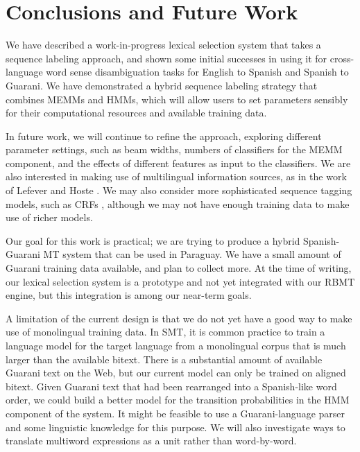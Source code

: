 \section{Conclusions and Future Work}
We have described a work-in-progress lexical selection system that takes a
sequence labeling approach, and shown some initial successes in using it for
cross-language word sense disambiguation tasks for English to Spanish and
Spanish to Guarani.  We have demonstrated a hybrid sequence labeling strategy
that combines MEMMs and HMMs, which will allow users to set parameters sensibly
for their computational resources and available training data.

In future work, we will continue to refine the approach, exploring different
parameter settings, such as beam widths, numbers of classifiers for the MEMM
component, and the effects of different features as input to the classifiers.
We are also interested in making use of multilingual information sources,
as in the work of Lefever and Hoste
\cite{lefever-hoste-decock:2011:ACL-HLT2011}. We may also consider more
sophisticated sequence tagging models, such as CRFs
\cite{DBLP:conf/icml/LaffertyMP01}, although we may not have enough training
data to make use of richer models.

Our goal for this work is practical; we are trying to produce a hybrid
Spanish-Guarani MT system that can be used in Paraguay. We have a small amount
of Guarani training data available, and plan to collect more.  At the time of
writing, our lexical selection system is a prototype and not yet integrated
with our RBMT engine, but this integration is among our near-term goals.

A limitation of the current design is that we do not yet have a good way to
make use of monolingual training data. In SMT, it is common practice to train a
language model for the target language from a monolingual corpus that is much
larger than the available bitext. There is a substantial amount of available
Guarani text on the Web, but our current
model can only be trained on aligned bitext. Given Guarani text that had been
rearranged into a Spanish-like word order, we could build a better model for
the transition probabilities in the HMM component of the system. It might be
feasible to use a Guarani-language parser and some linguistic knowledge for
this purpose.
We will also investigate ways to translate multiword expressions as a unit
rather than word-by-word.
